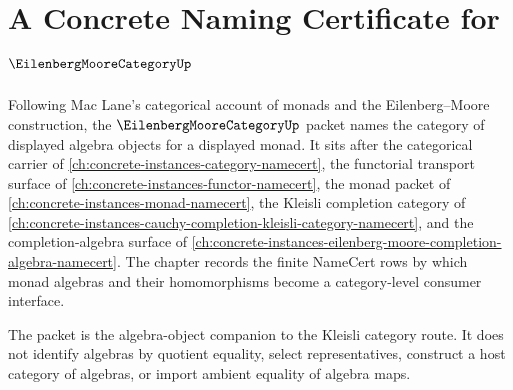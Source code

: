 \chapter{A Concrete Naming Certificate for $\EilenbergMooreCategoryUp$}
\label{ch:concrete-instances-eilenberg-moore-category-namecert}

Following Mac Lane's categorical account of monads and the Eilenberg--Moore construction, the $\EilenbergMooreCategoryUp$ packet names the category of displayed algebra objects for a displayed monad. It sits after the categorical carrier of \autoref{ch:concrete-instances-category-namecert}, the functorial transport surface of \autoref{ch:concrete-instances-functor-namecert}, the monad packet of \autoref{ch:concrete-instances-monad-namecert}, the Kleisli completion category of \autoref{ch:concrete-instances-cauchy-completion-kleisli-category-namecert}, and the completion-algebra surface of \autoref{ch:concrete-instances-eilenberg-moore-completion-algebra-namecert}. The chapter records the finite NameCert rows by which monad algebras and their homomorphisms become a category-level consumer interface.

The packet is the algebra-object companion to the Kleisli category route. It does not identify algebras by quotient equality, select representatives, construct a host category of algebras, or import ambient equality of algebra maps.

